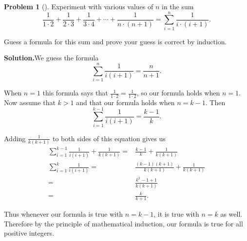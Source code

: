 \documentclass[10pt,]{book}
\theoremstyle{plain}
\theoremstyle{definition}
\newtheorem{activity}[project]{Problem}
\theoremstyle{definition}
\numberwithin{equation}{chapter}
\newcommand{\amp}{&}
\begin{document}
\begin{activity}[]\label{activity-364}
Experiment with various values of \(n\) in the sum%
\begin{equation*}
\frac{1}{1\cdot2}+\frac{1}{2\cdot3} + \frac{1}{3\cdot
4}+\cdots+\frac{1}{n\cdot (n+1)} = \sum_{i=1}^n \frac{1}{i\cdot(i+1)}.
\end{equation*}
%
\par
Guess a formula for this sum and prove your guess is correct by induction.%
\par\medskip\noindent%
\textbf{Solution.}\quad We guess the formula%
\begin{equation*}
\sum_{i=1}^n\frac{1}{i(i+1)} = \frac{n}{n+1}.
\end{equation*}
%
\par
When \(n=1\) this formula says that \(\frac{1}{1\cdot2}=\frac{1}{1\cdot
2}\), so our formula holds when \(n=1\). Now assume that \(k>1\) and that our formula holds when \(n=k-1\). Then%
\begin{equation*}
\sum_{i=1}^{k-1} \frac{1}{i(i+1)}= \frac{k-1}{k}.
\end{equation*}
%
\par
Adding \(\frac{1}{k(k+1)}\) to both sides of this equation gives us%
\begin{align*}
\sum_{i=1}^{k-1} \frac{1}{i(i+1)}+\frac{1}{k(k+1)}  =\amp  \frac{k-1}{k}+\frac{1}{k(k+1)}\\
\sum_{i=1}^k \frac{1}{i(i+1)} =\amp \frac{(k-1)(k+1)}{k(k+1)}+\frac{1}{k(k+1)}\\
=\amp \frac{k^2 -1 +1}{k(k+1)}\\
=\amp  \frac{k}{k+1}.
\end{align*}
%
\par
Thus whenever our formula is true with \(n=k-1\), it is true with \(n=k\) as well. Therefore by the principle of mathematical induction, our formula is true for all positive integers.%
\end{activity}
\end{document}
